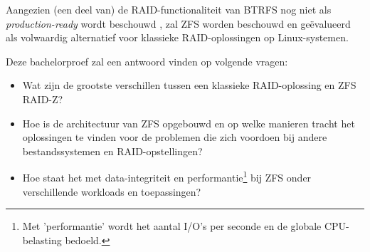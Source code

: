 Aangezien (een deel van) de RAID-functionaliteit van BTRFS nog niet als \textit{production-ready} wordt beschouwd \autocite{Project2017}, zal ZFS worden beschouwd en geëvalueerd als volwaardig alternatief voor klassieke RAID-oplossingen op Linux-systemen. 

Deze bachelorproef zal een antwoord vinden op volgende vragen:

\begin{itemize}
	\item{Wat zijn de grootste verschillen tussen een klassieke RAID-oplossing en ZFS RAID-Z?}
	\item{Hoe is de architectuur van ZFS opgebouwd en op welke manieren tracht het oplossingen te vinden voor de problemen die zich voordoen bij andere bestandssystemen en RAID-opstellingen?}
  \item{Hoe staat het met data-integriteit en \gls{performantie}\footnote{Met 'performantie' wordt het aantal I/O's per seconde en de globale CPU-belasting bedoeld.} bij ZFS onder verschillende workloads en toepassingen?}
\end{itemize}


